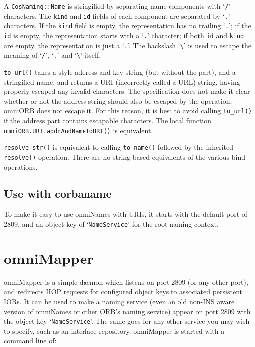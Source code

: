 \documentclass[11pt,oneside,a4paper]{book}
\newcommand{\type}[1]{\texttt{#1}}
\newcommand{\code}[1]{\texttt{#1}}
\newcommand{\op}[1]{\texttt{#1()}}
\begin{document}
A \type{CosNaming::Name} is stringified by separating name components
with `\texttt{/}' characters. The \code{kind} and \code{id} fields of
each component are separated by `\texttt{.}' characters. If the
\code{kind} field is empty, the representation has no trailing
`\texttt{.}'; if the \code{id} is empty, the representation starts
with a `\texttt{.}' character; if both \texttt{id} and \texttt{kind}
are empty, the representation is just a `\texttt{.}'. The backslash
`\texttt{\textbackslash}' is used to escape the meaning of
`\texttt{/}', `\texttt{.}' and `\texttt{\textbackslash}' itself.

\op{to\_url} takes a  style address and key string
(but without the  part), and a stringified name,
and returns a  URI (incorrectly called a URL)
string, having properly escaped any invalid characters. The
specification does not make it clear whether or not the address string
should also be escaped by the operation; omniORB does not escape
it. For this reason, it is best to avoid calling \op{to\_url} if the
address part contains escapable characters.  The local function
\op{omniORB.URI.addrAndNameToURI} is equivalent.

\op{resolve\_str} is equivalent to calling \op{to\_name} followed by
the inherited \op{resolve} operation. There are no string-based
equivalents of the various bind operations.


\subsection{Use with corbaname}

To make it easy to use omniNames with  URIs, it
starts with the default port of 2809, and an object key of
`\texttt{NameService}' for the root naming context.


\section{omniMapper}

omniMapper is a simple daemon which listens on port 2809 (or any other
port), and redirects IIOP requests for configured object keys to
associated persistent IORs. It can be used to make a naming service
(even an old non-INS aware version of omniNames or other ORB's naming
service) appear on port 2809 with the object key
`\texttt{NameService}'. The same goes for any other service you may
wish to specify, such as an interface repository. omniMapper is
started with a command line of:
\end{document}
